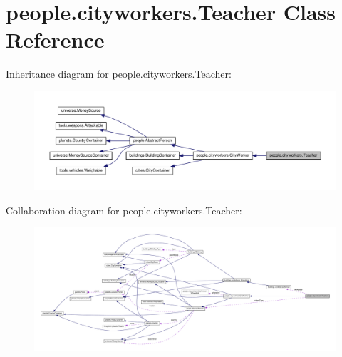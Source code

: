 \hypertarget{classpeople_1_1cityworkers_1_1_teacher}{}\section{people.\+cityworkers.\+Teacher Class Reference}
\label{classpeople_1_1cityworkers_1_1_teacher}


Inheritance diagram for people.\+cityworkers.\+Teacher\+:
\nopagebreak
\begin{figure}[H]
\begin{center}
\leavevmode
\includegraphics[width=350pt]{classpeople_1_1cityworkers_1_1_teacher__inherit__graph}
\end{center}
\end{figure}


Collaboration diagram for people.\+cityworkers.\+Teacher\+:
\nopagebreak
\begin{figure}[H]
\begin{center}
\leavevmode
\includegraphics[width=350pt]{classpeople_1_1cityworkers_1_1_teacher__coll__graph}
\end{center}
\end{figure}
